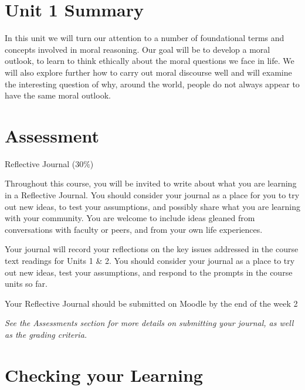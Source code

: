\documentclass[
]{book}
\begin{document}
\hypertarget{unit-1-summary}{%
\section*{Unit 1 Summary}\label{unit-1-summary}}

In this unit we will turn our attention to a number of foundational terms and concepts involved in moral reasoning. Our goal will be to develop a moral outlook, to learn to think ethically about the moral questions we face in life. We will also explore further how to carry out moral discourse well and will examine the interesting question of why, around the world, people do not always appear to have the same moral outlook.

\hypertarget{assessment-1}{%
\section*{Assessment}\label{assessment-1}}

\begin{assessment}
{Reflective Journal (30\%)}

Throughout this course, you will be invited to write about what you are learning in a Reflective Journal. You should consider your journal as a place for you to try out new ideas, to test your assumptions, and possibly share what you are learning with your community. You are welcome to include ideas gleaned from conversations with faculty or peers, and from your own life experiences.

Your journal will record your reflections on the key issues addressed in the course text readings for Units 1 \& 2. You should consider your journal as a place to try out new ideas, test your assumptions, and respond to the prompts in the course units so far.

Your Reflective Journal should be submitted on Moodle by the end of the week 2

\emph{See the Assessments section for more details on submitting your journal, as well as the grading criteria.}
\end{assessment}

\hypertarget{checking-your-learning}{%
\section*{Checking your Learning}\label{checking-your-learning}}
\end{document}

